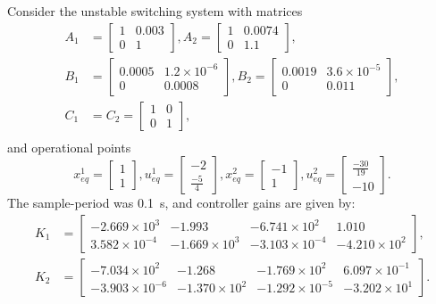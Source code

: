 Consider the unstable switching system with matrices
%
\begin{align*}
  A_1 & =
  \begin{bmatrix}
    1 & 0.003 \\
    0 & 1
  \end{bmatrix},
  A_2 = \begin{bmatrix}
    1 & 0.0074 \\
    0 & 1.1
  \end{bmatrix}, \\
  B_1 & =
  \begin{bmatrix}
    0.0005 & 1.2\times{}10^{-6} \\
    0      & 0.0008
  \end{bmatrix},
  B_2 = \begin{bmatrix}
    0.0019 & 3.6\times{}10^{-5} \\
    0      & 0.011
  \end{bmatrix}, \\
  C_1 & = C_2 =
  \begin{bmatrix}
    1 & 0 \\
    0 & 1
  \end{bmatrix},       \\
\end{align*}
%
and operational points
%
\[
  x_{eq}^1 = \begin{bmatrix}
    1 \\ 1
  \end{bmatrix},
  u_{eq}^1 = \begin{bmatrix}
    -2 \\ \frac{-5}{4}
  \end{bmatrix},
  x_{eq}^2 = \begin{bmatrix}
    -1 \\ 1
  \end{bmatrix},
  u_{eq}^2 = \begin{bmatrix}
    \frac{-30}{19} \\ -10
  \end{bmatrix}.
\]
%
The sample-period was \SI{0.1}{\second}, and controller gains are given by:
%
\scriptsize
\begin{align*}
  K_1 & = \begin{bmatrix}
    -2.669\times{}10^3   & -1.993             & -6.741\times{}10^2    & 1.010              \\
    3.582\times{}10^{-4} & -1.669\times{}10^3 & -3.103\times{}10^{-4} & -4.210\times{}10^2
  \end{bmatrix}, \\
  K_2 & = \begin{bmatrix}
    -7.034\times{}10^2    & -1.268             & -1.769\times{}10^2    & 6.097\times{}10^{-1} \\
    -3.903\times{}10^{-6} & -1.370\times{}10^2 & -1.292\times{}10^{-5} & -3.202\times{}10^1
  \end{bmatrix}.
\end{align*}
\normalsize

